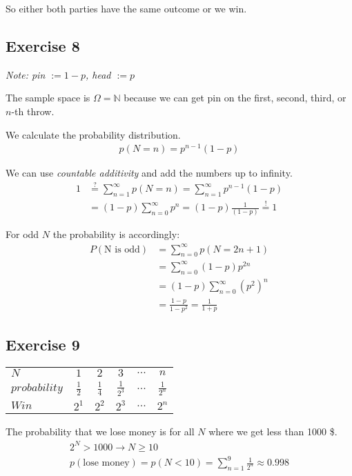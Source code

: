 \documentclass[../main/Notes.tex]{subfiles}
\begin{document}
So either both parties have the same outcome or we win.

\subsection*{Exercise 8}
\textit{Note: pin $:= 1-p$, head $:= p$}

The sample space is $\Omega = \mathbb{N}$ because we can get pin on the first, second, third, or $n$-th throw.

We calculate the probability distribution.
\begin{align*}
p(N = n) = p^{n - 1} \left( 1 - p \right)
\end{align*}

We can use \textit{countable additivity} and add the numbers up to infinity.
\begin{align*}
1 &\stackrel{?}{=} \sum\limits_{n = 1}^\infty p(N = n) = \sum\limits_{n = 1}^\infty p^{n - 1}\left( 1 - p \right) \\
&= \left( 1 - p \right) \sum\limits_{n=0}^\infty p^n = \left( 1 - p \right) \frac{1}{\left( 1 - p \right)} \stackrel{!}{=} 1
\end{align*}

For odd $N$ the probability is accordingly:
\begin{align*}
P\left(\mbox{N is odd}\right) &= \sum\limits_{n=0}^\infty p(N=2n+1)\\
&= \sum\limits_{n=0}^\infty \left( 1 - p \right) p^{2n} \\
&= \left( 1 - p \right) \sum\limits_{n=0}^\infty \left(p^2\right)^n \\
&= \frac{1-p}{1-p^2} = \frac{1}{1+p}
\end{align*}

\subsection*{Exercise 9}
\begin{tabular}{ l || c | c | c | c | c }
  $N$           & $1$ & $2$ & $3$ & $...$ & $n$ \\
  $probability$ & $\frac{1}{2}$ & $\frac{1}{4}$ & $\frac{1}{2^3}$ & $...$ & $\frac{1}{2^n}$ \\
  $Win$         & $2^1$ & $2^2$ & $2^3$ & $...$ & $2^n$ \\
\end{tabular}

The probability that we lose money is for all $N$ where we get less than 1000 \$.
\begin{align*}
2^N > 1000 \rightarrow N \geq 10 \\
p\left(\mbox{lose money}\right) = p(N<10) = \sum\limits_{n=1}^9 \frac{1}{2^n} \approx 0.998
\end{align*}
\end{document}
